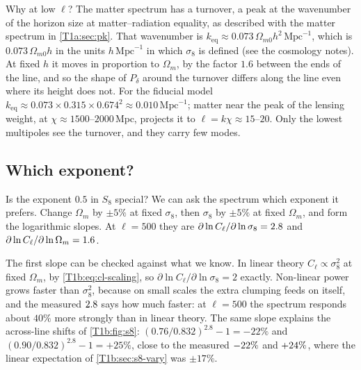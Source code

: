 Why at low $\ell$? The matter spectrum has a turnover, a peak at the wavenumber of the horizon size at matter--radiation equality, as described with the matter spectrum in \cref{T1a:sec:pk}. That wavenumber is $k_{\mathrm{eq}}\approx0.073\,\Omega_{m0}h^2\,\mathrm{Mpc}^{-1}$, which is $0.073\,\Omega_{m0}h$ in the units $h\,\mathrm{Mpc}^{-1}$ in which $\sigma_8$ is defined (see the cosmology notes). At fixed $h$ it moves in proportion to $\Omega_m$, by the factor $1.6$ between the ends of the line, and so the shape of $P_\delta$ around the turnover differs along the line even where its height does not. For the fiducial model $k_{\mathrm{eq}}\approx0.073\times0.315\times0.674^2\approx0.010\,\mathrm{Mpc}^{-1}$; matter near the peak of the lensing weight, at $\chi\approx1500$--$2000\,\mathrm{Mpc}$, projects it to $\ell=k\chi\approx15$--$20$. Only the lowest multipoles see the turnover, and they carry few modes.

\subsection{Which exponent?}
\label{T1b:sec:s8-alpha}

Is the exponent $0.5$ in $S_8$ special? We can ask the spectrum which exponent it prefers. Change $\Omega_m$ by $\pm5\%$ at fixed $\sigma_8$, then $\sigma_8$ by $\pm5\%$ at fixed $\Omega_m$, and form the logarithmic slopes. At $\ell=500$ they are $\partial\ln C_\ell/\partial\ln\sigma_8=2.8$ and $\partial\ln C_\ell/\partial\ln\Omega_m=1.6$.

The first slope can be checked against what we know. In linear theory $C_\ell\propto\sigma_8^2$ at fixed $\Omega_m$, by \eqref{T1b:eq:cl-scaling}, so $\partial\ln C_\ell/\partial\ln\sigma_8=2$ exactly. Non-linear power grows faster than $\sigma_8^2$, because on small scales the extra clumping feeds on itself, and the measured $2.8$ says how much faster: at $\ell=500$ the spectrum responds about $40\%$ more strongly than in linear theory. The same slope explains the across-line shifts of \cref{T1b:fig:s8}: $(0.76/0.832)^{2.8}-1=-22\%$ and $(0.90/0.832)^{2.8}-1=+25\%$, close to the measured $-22\%$ and $+24\%$, where the linear expectation of \cref{T1b:sec:s8-vary} was $\pm17\%$.

